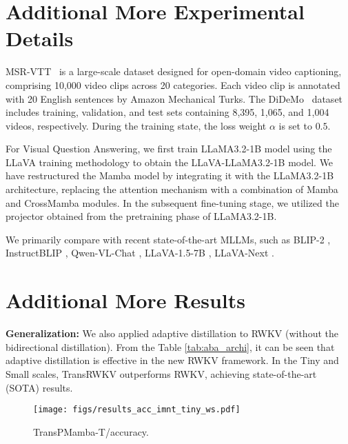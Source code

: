 \clearpage
\setcounter{page}{1}
\maketitlesupplementary


\section{Additional More Experimental Details}
\label{sec:add_detail}


 \quad
MSR-VTT~\cite{DBLP:conf/cvpr/XuMYR16} is a large-scale dataset designed for open-domain video captioning, comprising 10,000 video clips across 20 categories. 
Each video clip is annotated with 20 English sentences by Amazon Mechanical Turks. 
The DiDeMo~\cite{DBLP:conf/iccv/HendricksWSSDR17} dataset includes training, validation, and test sets containing 8,395, 1,065, and 1,004 videos, respectively.
During the training state, the loss weight $\alpha$ is set to $0.5$. 

For Visual Question Answering, we first train LLaMA3.2-1B model using the LLaVA training methodology to obtain the LLaVA-LLaMA3.2-1B model. We have restructured the Mamba model by integrating it with the LLaMA3.2-1B architecture, replacing the attention mechanism with a combination of Mamba and CrossMamba modules. In the subsequent fine-tuning stage, we utilized the projector obtained from the pretraining phase of LLaMA3.2-1B. 

 \quad
We primarily compare with recent state-of-the-art MLLMs, such as BLIP-2 \citep{Li2023BLIP2BL}, InstructBLIP \citep{Dai2023InstructBLIPTG}, Qwen-VL-Chat \citep{bai2023qwen}, LLaVA-1.5-7B \citep{Liu2023ImprovedBW}, LLaVA-Next \citep{li2024llava}.




\section{Additional More Results}
\label{sec:add_results}


 

\noindent\textbf{Generalization:} 
We also applied adaptive distillation to RWKV (without the bidirectional distillation). From the Table \ref{tab:aba_archi}, it can be seen that adaptive distillation is effective in the new RWKV framework. In the Tiny and Small scales, TransRWKV outperforms RWKV, achieving state-of-the-art (SOTA) results.

\begin{figure}[t]
  \centering
   \texttt{[image: figs/results\_acc\_imnt\_tiny\_ws.pdf]}

   \caption{TransPMamba-T/accuracy.}
   \label{fig:aba_ws}
\end{figure}



